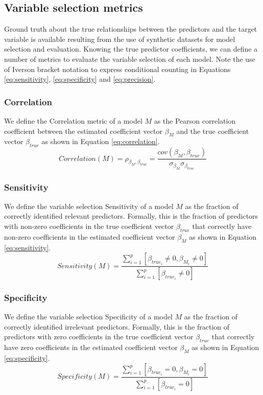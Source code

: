 \subsection{Variable selection metrics} \label{sec:varsel}
Ground truth about the true relationships between the predictors and the target variable is available resulting from the use of synthetic datasets for model selection and evaluation. Knowing the true predictor coefficients, we can define a number of metrics to evaluate the variable selection of each model. Note the use of Iverson bracket notation to express conditional counting in Equations \ref{eq:sensitivity}, \ref{eq:specificity} and \ref{eq:precision}.

\subsubsection{Correlation}
We define the Correlation metric of a model $M$ as the Pearson correlation coefficient between the estimated coefficient vector $\beta_M$ and the true coefficient vector $\beta_{true}$ as shown in Equation \ref{eq:correlation}. 
\begin{equation} \label{eq:correlation}
Correlation(M) = \rho_{\beta_M,\beta_{true}} = \frac{cov(\beta_M,\beta_{true})}{\sigma_{\beta_M} \sigma_{\beta_{true}}}
\end{equation}

\subsubsection{Sensitivity}
We define the variable selection Sensitivity of a model $M$ as the fraction of correctly identified relevant predictors. Formally, this is the fraction of predictors with non-zero coefficients in the true coefficient vector $\beta_{true}$ that correctly have non-zero coefficients in the estimated coefficient vector $\beta_M$ as shown in Equation \ref{eq:sensitivity}. 
\begin{equation} \label{eq:sensitivity}
Sensitivity(M) = \frac{\sum_{i=1}^{p}[\beta_{true_i} \ne 0, \beta_{M_i} \ne 0]}{\sum_{i=1}^{p}[\beta_{true_i} \ne 0]}
\end{equation}

\subsubsection{Specificity}
We define the variable selection Specificity of a model $M$ as the fraction of correctly identified irrelevant predictors. Formally, this is the fraction of predictors with zero coefficients in the true coefficient vector $\beta_{true}$ that correctly have zero coefficients in the estimated coefficient vector $\beta_M$ as shown in Equation \ref{eq:specificity}. 
\begin{equation} \label{eq:specificity}
Specificity(M) = \frac{\sum_{i=1}^{p}[\beta_{true_i} = 0, \beta_{M_i} = 0]}{\sum_{i=1}^{p}[\beta_{true_i} = 0]}
\end{equation}

